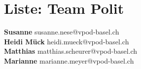 \documentclass{scrartcl}
\begin{document}
\section*{Liste: Team Polit}
\textbf{Susanne } susanne.nese@vpod-basel.ch\\
\textbf{Heidi Mück            } heidi.mueck@vpod-basel.ch\\
\textbf{Matthias } matthias.scheurer@vpod-basel.ch\\
\textbf{Marianne } marianne.meyer@vpod-basel.ch\\
\end{document}
